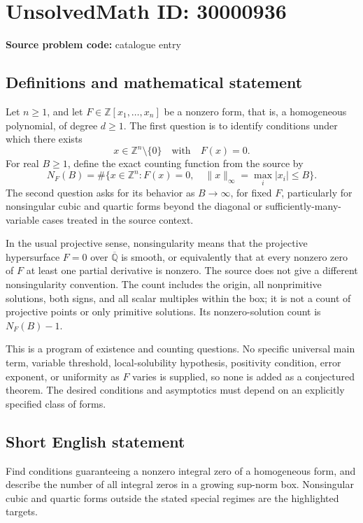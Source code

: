 \documentclass[11pt]{article}
\newcommand{\Z}{\mathbb{Z}}
\newcommand{\Q}{\mathbb{Q}}
\begin{document}
\section*{UnsolvedMath ID: 30000936}
\textbf{Source problem code:} catalogue entry
\subsection{Definitions and mathematical statement}
Let \(n\geq1\), and let \(F\in\Z[x_1,\ldots,x_n]\) be a nonzero form, that is, a homogeneous polynomial, of degree \(d\geq1\). The first question is to identify conditions under which there exists
\[
x\in\Z^n\setminus\{0\}\quad\text{with}\quad F(x)=0.
\]
For real \(B\geq1\), define the exact counting function from the source by
\[
N_F(B)=\#\{x\in\Z^n:F(x)=0,\quad\|x\|_\infty=\max_i|x_i|\leq B\}.
\]
The second question asks for its behavior as \(B\to\infty\), for fixed \(F\), particularly for nonsingular cubic and quartic forms beyond the diagonal or sufficiently-many-variable cases treated in the source context.

In the usual projective sense, nonsingularity means that the projective hypersurface \(F=0\) over \(\overline{\Q}\) is smooth, or equivalently that at every nonzero zero of \(F\) at least one partial derivative is nonzero. The source does not give a different nonsingularity convention. The count includes the origin, all nonprimitive solutions, both signs, and all scalar multiples within the box; it is not a count of projective points or only primitive solutions. Its nonzero-solution count is \(N_F(B)-1\).

This is a program of existence and counting questions. No specific universal main term, variable threshold, local-solubility hypothesis, positivity condition, error exponent, or uniformity as \(F\) varies is supplied, so none is added as a conjectured theorem. The desired conditions and asymptotics must depend on an explicitly specified class of forms.
\subsection{Short English statement}
Find conditions guaranteeing a nonzero integral zero of a homogeneous form, and describe the number of all integral zeros in a growing sup-norm box. Nonsingular cubic and quartic forms outside the stated special regimes are the highlighted targets.
\end{document}
